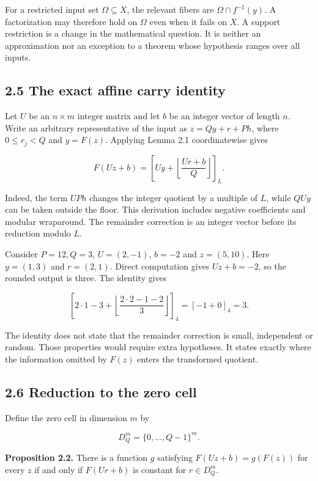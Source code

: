 \documentclass[
]{article}
\begin{document}
For a restricted input set \(\Omega\subseteq X\), the relevant fibers
are \(\Omega\cap f^{-1}(y)\). A factorization may therefore hold on
\(\Omega\) even when it fails on \(X\). A support restriction is a
change in the mathematical question. It is neither an approximation nor
an exception to a theorem whose hypothesis ranges over all inputs.

\subsection{2.5 The exact affine carry
identity}\label{the-exact-affine-carry-identity}

Let \(U\) be an \(n\times m\) integer matrix and let \(b\) be an integer
vector of length \(n\). Write an arbitrary representative of the input
as \(z=Qy+r+Ph\), where \(0\le r_j<Q\) and \(y=F(z)\). Applying Lemma
2.1 coordinatewise gives

\[
F(Uz+b)=\left[Uy+\left\lfloor\frac{Ur+b}{Q}\right\rfloor\right]_L.
\]

Indeed, the term \(UPh\) changes the integer quotient by a multiple of
\(L\), while \(QUy\) can be taken outside the floor. This derivation
includes negative coefficients and modular wraparound. The remainder
correction is an integer vector before its reduction modulo \(L\).

Consider \(P=12,Q=3\), \(U=(2,-1)\), \(b=-2\) and \(z=(5,10)\). Here
\(y=(1,3)\) and \(r=(2,1)\). Direct computation gives \(Uz+b=-2\), so
the rounded output is three. The identity gives

\[
\left[2\cdot1-3+\left\lfloor\frac{2\cdot2-1-2}{3}\right\rfloor\right]_4
=[-1+0]_4=3.
\]

The identity does not state that the remainder correction is small,
independent or random. Those properties would require extra hypotheses.
It states exactly where the information omitted by \(F(z)\) enters the
transformed quotient.

\subsection{2.6 Reduction to the zero
cell}\label{reduction-to-the-zero-cell}

Define the zero cell in dimension \(m\) by

\[
D_Q^m=\{0,\ldots,Q-1\}^m.
\]

\textbf{Proposition 2.2.} There is a function \(g\) satisfying
\(F(Uz+b)=g(F(z))\) for every \(z\) if and only if \(F(Ur+b)\) is
constant for \(r\in D_Q^m\).
\end{document}
